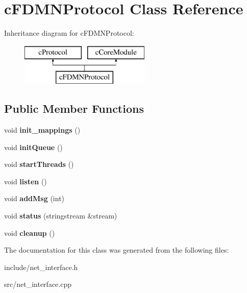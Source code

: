 \hypertarget{classcFDMNProtocol}{\section{c\-F\-D\-M\-N\-Protocol \-Class \-Reference}
\label{d7/d9d/classcFDMNProtocol}
}
\-Inheritance diagram for c\-F\-D\-M\-N\-Protocol\-:\begin{figure}[H]
\begin{center}
\leavevmode
\includegraphics[height=2.000000cm]{d7/d9d/classcFDMNProtocol}
\end{center}
\end{figure}
\subsection*{\-Public \-Member \-Functions}
\begin{DoxyCompactItemize}
\item 
\hypertarget{classcFDMNProtocol_a39964d16ee56e37c020fa82665b52831}{void {\bfseries init\-\_\-mappings} ()}\label{d7/d9d/classcFDMNProtocol_a39964d16ee56e37c020fa82665b52831}

\item 
\hypertarget{classcFDMNProtocol_a5a1475b1b4cb6fc548bb9879a2bfee11}{void {\bfseries init\-Queue} ()}\label{d7/d9d/classcFDMNProtocol_a5a1475b1b4cb6fc548bb9879a2bfee11}

\item 
\hypertarget{classcFDMNProtocol_ab7f40203a9fc3564100dc96ec55429d4}{void {\bfseries start\-Threads} ()}\label{d7/d9d/classcFDMNProtocol_ab7f40203a9fc3564100dc96ec55429d4}

\item 
\hypertarget{classcFDMNProtocol_a7c00ee18ee000d08d6de92a3166c44d9}{void {\bfseries listen} ()}\label{d7/d9d/classcFDMNProtocol_a7c00ee18ee000d08d6de92a3166c44d9}

\item 
\hypertarget{classcFDMNProtocol_ab1e32cb3c94a8932030e40f4841aa9b7}{void {\bfseries add\-Msg} (int)}\label{d7/d9d/classcFDMNProtocol_ab1e32cb3c94a8932030e40f4841aa9b7}

\item 
\hypertarget{classcFDMNProtocol_aea7f1aa23979f8a79830d65b08988eaf}{void {\bfseries status} (stringstream \&stream)}\label{d7/d9d/classcFDMNProtocol_aea7f1aa23979f8a79830d65b08988eaf}

\item 
\hypertarget{classcFDMNProtocol_aac11ecb86235973a957d683d67b6da0e}{void {\bfseries cleanup} ()}\label{d7/d9d/classcFDMNProtocol_aac11ecb86235973a957d683d67b6da0e}

\end{DoxyCompactItemize}


\-The documentation for this class was generated from the following files\-:\begin{DoxyCompactItemize}
\item 
include/net\-\_\-interface.\-h\item 
src/net\-\_\-interface.\-cpp\end{DoxyCompactItemize}
